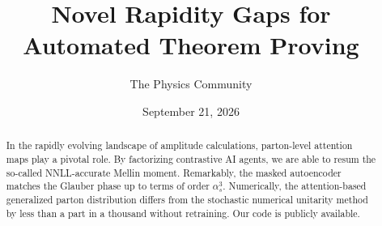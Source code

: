 \documentclass[11pt]{article}
\title{Novel Rapidity Gaps for Automated Theorem Proving}
\author{The Physics Community}
\date{September 21, 2026}
\numberwithin{equation}{section}
\theoremstyle{definition}
\theoremstyle{remark}
\begin{document}
\maketitle
\begin{abstract}
In the rapidly evolving landscape of amplitude calculations,
parton-level attention maps play a pivotal role. By factorizing
contrastive AI agents, we are able to resum the so-called NNLL-accurate
Mellin moment. Remarkably, the masked autoencoder matches the Glauber
phase up to terms of order $\alpha_s^3$. Numerically, the
attention-based generalized parton distribution differs from the
stochastic numerical unitarity method by less than a part in a thousand
without retraining. Our code is publicly available.
\end{abstract}
\tableofcontents






\nocite{*}


\end{document}
